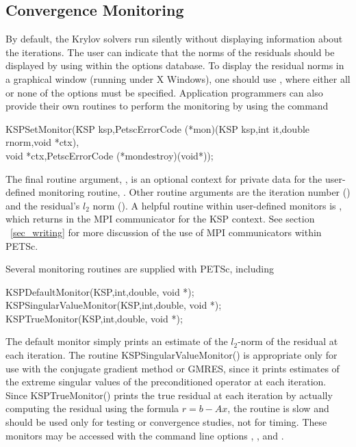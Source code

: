 \subsection{Convergence Monitoring}
\label{sec_kspmonitor}

By default, the Krylov solvers run silently without displaying information 
about the iterations. The user can indicate that the norms of the residuals 
should be displayed by using 
 within the options database.  
To display the residual norms in a graphical window (running under X Windows),
one should use  \trl{[x,y,w,h]}, where either all or none of 
the options must be specified. 
Application programmers can also provide their own routines to perform 
the monitoring by using the command 
\begin{tabbing}
  KSPSetMonitor(\=KSP ksp,PetscErrorCode (*mon)(KSP ksp,int it,double rnorm,void *ctx),\\
                \>        void *ctx,PetscErrorCode (*mondestroy)(void*));
\end{tabbing}
The final routine argument, , is an optional context for private
data for the user-defined monitoring routine, .  Other
 routine arguments are the iteration
number () and the residual's $ l_2 $ norm ().
A helpful routine within user-defined monitors is 
, which returns
in    the
MPI communicator for the KSP context.  See section ~\ref{sec_writing}
for more discussion of the use of MPI communicators within PETSc.

Several monitoring routines are supplied with PETSc, 
including  
\begin{tabbing}
  KSPDefaultMonitor(KSP,int,double, void *);\\
  KSPSingularValueMonitor(KSP,int,double, void *);\\
  KSPTrueMonitor(KSP,int,double, void *);
\end{tabbing}
The default monitor simply prints an estimate of the $l_2$-norm of the 
residual at each iteration. The routine
KSPSingularValueMonitor() is appropriate only for use with the conjugate 
gradient method or GMRES, since it prints estimates of the extreme singular 
values of the preconditioned operator at each iteration. Since
KSPTrueMonitor() prints 
the true residual at each iteration by 
actually computing the residual using the formula $ r = b - Ax $, the routine
is slow and should be used only for testing or convergence studies,
not for timing. These monitors may be accessed with the command line options
, , and .
  

